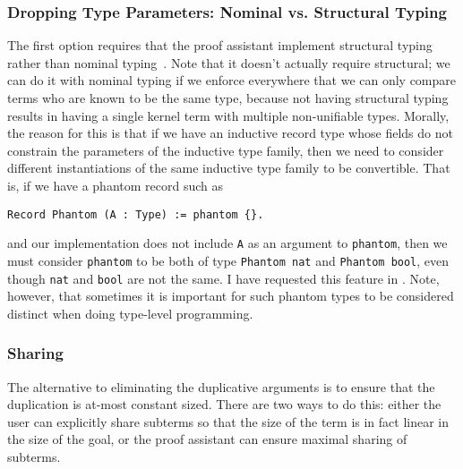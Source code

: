 \subsubsection{Dropping Type Parameters: Nominal {vs.} Structural Typing} \label{sec:nominal-vs-structural} \label{sec:dropping-constructor-parameters}
The first option requires that the proof assistant implement structural typing rather than nominal typing~\cite[19.3 Nominal and Structural Type Systems]{tapl}.
Note that it doesn't actually require structural; we can do it with nominal typing if we enforce everywhere that we can only compare terms who are known to be the same type, because not having structural typing results in having a single kernel term with multiple non-unifiable types.
Morally, the reason for this is that if we have an inductive record type whose fields do not constrain the parameters of the inductive type family, then we need to consider different instantiations of the same inductive type family to be convertible.
That is, if we have a phantom record such as
\begin{verbatim}
Record Phantom (A : Type) := phantom {}.
\end{verbatim}
and our implementation does not include \texttt{A} as an argument to \texttt{phantom}, then we must consider \texttt{phantom} to be both of type \texttt{Phantom nat} and \texttt{Phantom bool}, even though \texttt{nat} and \texttt{bool} are not the same.
I have requested this feature in .
Note, however, that sometimes it is important for such phantom types to be considered distinct when doing type-level programming.

\subsubsection{Sharing} \label{sec:sharing}
The alternative to eliminating the duplicative arguments is to ensure that the duplication is at-most constant sized.
There are two ways to do this: either the user can explicitly share subterms so that the size of the term is in fact linear in the size of the goal, or the proof assistant can ensure maximal sharing of subterms.

